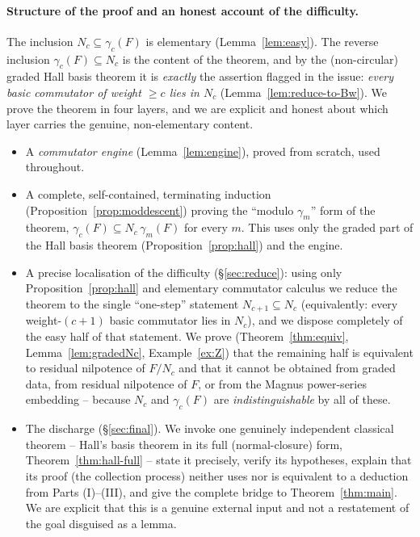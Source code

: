\documentclass{amsart}
\theoremstyle{definition}
\theoremstyle{remark}
\begin{document}
\paragraph{Structure of the proof and an honest account of the difficulty.}
The inclusion $N_c\subseteq\gamma_c(F)$ is elementary (Lemma~\ref{lem:easy}). The
reverse inclusion $\gamma_c(F)\subseteq N_c$ is the content of the theorem, and by
the (non-circular) graded Hall basis theorem it is \emph{exactly} the assertion
flagged in the issue: \emph{every basic commutator of weight $\ge c$ lies in
$N_c$} (Lemma~\ref{lem:reduce-to-Bw}). We prove the theorem in four layers, and we
are explicit and honest about which layer carries the genuine, non-elementary
content.
\begin{itemize}
\item[(I)] A \emph{commutator engine} (Lemma~\ref{lem:engine}), proved from
scratch, used throughout.
\item[(II)] A complete, self-contained, terminating induction
(Proposition~\ref{prop:moddescent}) proving the ``modulo $\gamma_m$'' form of the
theorem, $\gamma_c(F)\subseteq N_c\,\gamma_m(F)$ for every $m$. This uses only the
graded part of the Hall basis theorem (Proposition~\ref{prop:hall}) and the
engine.
\item[(III)] A precise localisation of the difficulty (\S\ref{sec:reduce}): using
only Proposition~\ref{prop:hall} and elementary commutator calculus we reduce the
theorem to the single ``one-step'' statement $N_{c+1}\subseteq N_c$ (equivalently:
every weight-$(c+1)$ basic commutator lies in $N_c$), and we dispose completely of
the easy half of that statement. We prove (Theorem~\ref{thm:equiv},
Lemma~\ref{lem:gradedNc}, Example~\ref{ex:Z}) that the remaining half is
equivalent to residual nilpotence of $F/N_c$ and that it cannot be obtained from
graded data, from residual nilpotence of $F$, or from the Magnus power-series
embedding -- because $N_c$ and $\gamma_c(F)$ are \emph{indistinguishable} by all of
these.
\item[(IV)] The discharge (\S\ref{sec:final}). We invoke one genuinely
independent classical theorem -- Hall's basis theorem in its full
(normal-closure) form, Theorem~\ref{thm:hall-full} -- state it precisely, verify
its hypotheses, explain that its proof (the collection process) neither uses nor
is equivalent to a deduction from Parts (I)--(III), and give the complete bridge
to Theorem~\ref{thm:main}. We are explicit that this is a genuine external input
and not a restatement of the goal disguised as a lemma.
\end{itemize}
\end{document}
